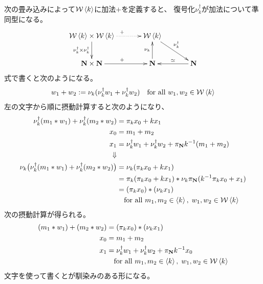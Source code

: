 	次の畳み込みによって${{\mathcal{W}}}\mathinner{\langle{k}\rangle}$に加法$+$を定義すると、
	復号化$\nu_k^\dag$が加法について準同型になる。
	\begin{equation*}\xymatrix@C=8ex{
		\Word\braket{k}\times \Word\braket{k}
			\ar@{.>}[r]^{+} \ar[d]_{\nu_k^\dag\times\nu_k^\dag} 
			& \Word\braket{k} \ar[rd]^{\nu_k^\dag} \\
		\sizen\times \sizen \ar[r]^{+} & \sizen \ar[u]^{\nu_k}
			& \sizen \ar[l]_\simeq \\
	}\end{equation*}
	式で書くと次のようになる。
	\begin{equation*}\begin{split}
		w_1 + w_2 := \nu_k(\nu_k^\dag w_1 + \nu_k^\dag w_2)
		\quad\text{for all }w_1,w_2\in{\ensuremath{{\mathcal{W}}}}\mathinner{\langle{k}\rangle}
	\end{split}\end{equation*}
	左の文字から順に摂動計算すると次のようになり、
	\begin{equation*}\begin{split}
		\nu_k^\dag(m_1*w_1) + \nu_k^\dag(m_2*w_2)
		&= \pi_kx_0 + kx_1 \\
		x_0 &= m_1 + m_2 \\
		x_1 &= \nu_k^\dag w_1 + \nu_k^\dag w_2 + \pi_{\mathbf{N}} k^{-1}(m_1 + m_2) \\
		\Downarrow \\
		\nu_k\bigl(\nu_k^\dag(m_1*w_1) + \nu_k^\dag(m_2*w_2)\bigr)
		&= \nu_k(\pi_kx_0 + kx_1) \\
		&= \pi_k(\pi_kx_0 + kx_1) * \nu_k\pi_{\mathbf{N}}(k^{-1}\pi_kx_0 + x_1) \\
		&= (\pi_kx_0) * (\nu_kx_1) \\
		&\quad\text{for all }m_1,m_2\in\mathinner{\langle{k}\rangle},\;w_1,w_2\in{\ensuremath{{\mathcal{W}}}}\mathinner{\langle{k}\rangle}
	\end{split}\end{equation*}
	次の摂動計算が得られる。
	\begin{equation*}\begin{split}
		(m_1*w_1) + (m_2*w_2) &= (\pi_kx_0) * (\nu_kx_1) \\
		x_0 &= m_1 + m_2 \\
		x_1 &= \nu_k^\dag w_1 + \nu_k^\dag w_2 + \pi_{\mathbf{N}} k^{-1}x_0 \\
		&\quad\text{for all }m_1,m_2\in\mathinner{\langle{k}\rangle},\;w_1,w_2\in{\ensuremath{{\mathcal{W}}}}\mathinner{\langle{k}\rangle}
	\end{split}\end{equation*}
	文字を使って書くとが馴染みのある形になる。

